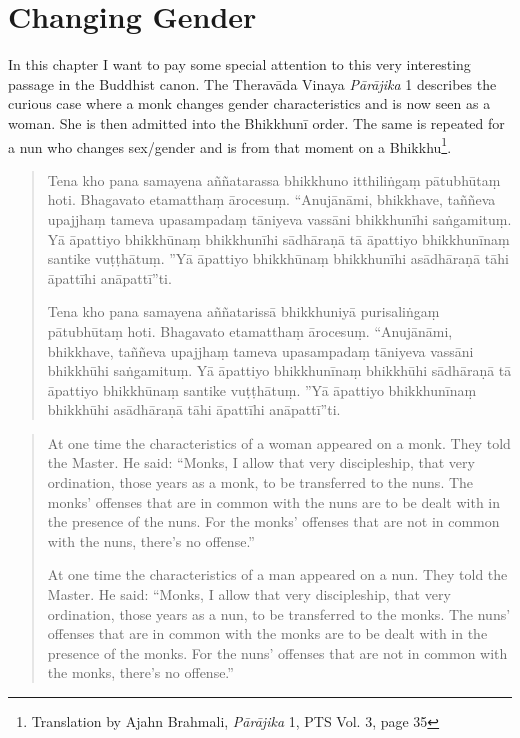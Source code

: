 \section{Changing Gender}

In this chapter I want to pay some special attention to this very interesting passage in the Buddhist canon. The Theravāda Vinaya {\em Pā­rāji­ka} 1 describes the curious case where a monk changes gender characteristics and is now seen as a woman. She is then admitted into the Bhikkhunī order. The same is repeated for a nun who changes sex/gender and is from that moment on a Bhikkhu\footnote{Translation by Ajahn Brahmali, {\em Pā­rāji­ka} 1, PTS Vol. 3, page 35}. 

\begin{quote}
Tena kho pana samayena aññatarassa bhikkhuno itthiliṅgaṃ pātubhūtaṃ hoti. Bhagavato etamatthaṃ ārocesuṃ. “Anujānāmi, bhikkhave, taññeva upajjhaṃ tameva upasampadaṃ tāniyeva vassāni bhikkhunīhi saṅgamituṃ. Yā āpattiyo bhikkhūnaṃ bhikkhunīhi sādhāraṇā tā āpattiyo bhikkhunīnaṃ santike vuṭṭhātuṃ. ”Yā āpattiyo bhikkhūnaṃ bhikkhunīhi asādhāraṇā tāhi āpattīhi anāpattī”ti.

Tena kho pana samayena aññatarissā bhikkhuniyā purisaliṅgaṃ pātubhūtaṃ hoti. Bhagavato etamatthaṃ ārocesuṃ. “Anujānāmi, bhikkhave, taññeva upajjhaṃ tameva upasampadaṃ tāniyeva vassāni bhikkhūhi saṅgamituṃ. Yā āpattiyo bhikkhunīnaṃ bhikkhūhi sādhāraṇā tā āpattiyo bhikkhūnaṃ santike vuṭṭhātuṃ. ”Yā āpattiyo bhikkhunīnaṃ bhikkhūhi asādhāraṇā tāhi āpattīhi anāpattī”ti.
\end{quote}
\medskip

\begin{quote}
At one time the characteristics of a woman appeared on a monk. They told the Master. He said: “Monks, I allow that very discipleship, that very ordination, those years as a monk, to be transferred to the nuns. The monks’ offenses that are in common with the nuns are to be dealt with in the presence of the nuns. For the monks’ offenses that are not in common with the nuns, there’s no offense.”

At one time the characteristics of a man appeared on a nun. They told the Master. He said: “Monks, I allow that very discipleship, that very ordination, those years as a nun, to be transferred to the monks. The nuns’ offenses that are in common with the monks are to be dealt with in the presence of the monks. For the nuns’ offenses that are not in common with the monks, there’s no offense.”
\end{quote}

